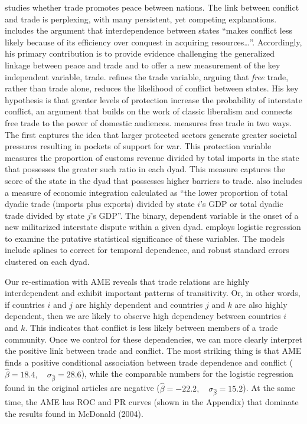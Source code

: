\citet{mcdonald:2004} studies whether trade promotes peace between nations. The link between conflict and trade is perplexing, with many persistent, yet competing explanations. \citet[p. 547]{mcdonald:2004} includes the argument that interdependence between states ``makes conflict less likely because of its efficiency over conquest in acquiring resources\ldots''. Accordingly, his primary contribution is to provide evidence challenging the generalized linkage between peace and trade and to offer a new measurement of the key independent variable, trade. \citet{mcdonald:2004} refines the trade variable, arguing that \textit{free} trade, rather than trade alone, reduces the likelihood of conflict between states. His key hypothesis is that greater levels of protection increase the probability of interstate conflict, an argument that builds on the work of classic liberalism and connects free trade to the power of domestic audiences. \citet{mcdonald:2004} measures free trade in two ways. The first captures the idea that larger protected sectors generate greater societal pressures resulting in pockets of support for war. This protection variable measures the proportion of customs revenue divided by total imports in the state that possesses the greater such ratio in each dyad. This measure captures the score of the state in the dyad that possesses higher barriers to trade. \citet[p. 560]{mcdonald:2004} also includes a measure of economic integration  calculated as ``the lower proportion of total dyadic trade (imports plus exports) divided by state $i$'s GDP or total dyadic trade divided by state $j$'s GDP''. The binary, dependent variable is the onset of a new militarized interstate dispute within a given dyad. \citet{mcdonald:2004} employs logistic regression to examine the putative statistical significance of these variables. The models include splines to correct for temporal dependence, and robust standard errors clustered on each dyad.

Our re-estimation with AME reveals that trade relations are highly interdependent and exhibit important patterns of transitivity.  Or, in other words, if countries $i$ and $j$ are highly dependent and countries $j$ and $k$ are also highly dependent, then we are likely to observe high dependency between countries $i$ and $k$. This indicates that conflict is less likely between members of a trade community. Once we control for these dependencies, we can more clearly interpret the positive link between trade and conflict.  The most striking thing is that AME finds a positive conditional association between trade dependence and conflict ($\hat{\beta}= 18.4, \quad \sigma_{\hat{\beta}} = 28.6$), while the comparable numbers for the logistic regression found in the original articles are negative ($\hat{\beta}= -22.2, \quad \sigma_{\hat{\beta}} = 15.2$). At the same time, the AME has ROC and PR curves (shown in the Appendix) that dominate the results found in McDonald (2004).

